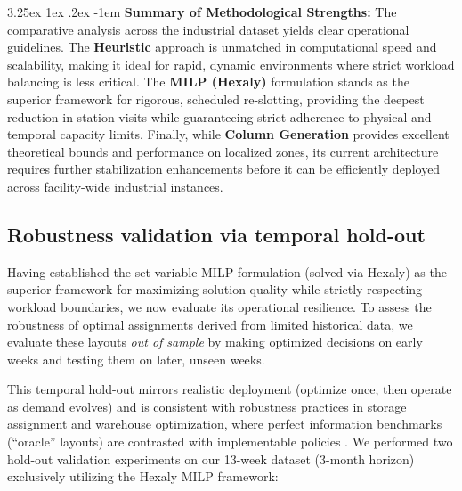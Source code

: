 \documentclass[preprint,review,11pt,authoryear]{elsarticle}
\makeatletter
\renewcommand\paragraph{\@startsection{paragraph}{4}{\z@}
  {3.25ex \@plus1ex \@minus.2ex}
  {-1em}
  {\normalfont\normalsize\itshape}}
\makeatother
\begin{document}
\paragraph{\textbf{Summary of Methodological Strengths: }}
The comparative analysis across the industrial dataset yields clear operational guidelines. The \textbf{Heuristic} approach is unmatched in computational speed and scalability, making it ideal for rapid, dynamic environments where strict workload balancing is less critical. The \textbf{MILP (Hexaly)} formulation stands as the superior framework for rigorous, scheduled re-slotting, providing the deepest reduction in station visits while guaranteeing strict adherence to physical and temporal capacity limits. Finally, while \textbf{Column Generation} provides excellent theoretical bounds and performance on localized zones, its current architecture requires further stabilization enhancements before it can be efficiently deployed across facility-wide industrial instances.


\subsection{Robustness validation via temporal hold-out}\label{sec:temporal_validation}

Having established the set-variable MILP formulation (solved via Hexaly) as the superior framework for maximizing solution quality while strictly respecting workload boundaries, we now evaluate its operational resilience. To assess the robustness of optimal assignments derived from limited historical data, we evaluate these layouts \emph{out of sample} by making optimized decisions on early weeks and testing them on later, unseen weeks. 

This temporal hold-out mirrors realistic deployment (optimize once, then operate as demand evolves) and is consistent with robustness practices in storage assignment and warehouse optimization, where perfect information benchmarks (``oracle'' layouts) are contrasted with implementable policies \citep{lee2020cie,wang2020}. We performed two hold-out validation experiments on our 13-week dataset (3-month horizon) exclusively utilizing the Hexaly MILP framework:
\end{document}
